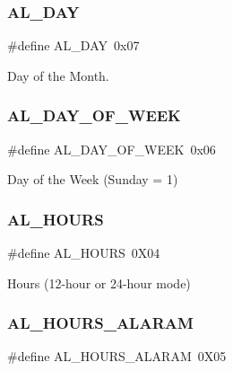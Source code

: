 \hypertarget{group___serial_gaa60f550f2d0cc5a3fe5177039150bc60}{}\label{group___serial_gaa60f550f2d0cc5a3fe5177039150bc60} 
\subsubsection{\texorpdfstring{A\+L\+\_\+\+D\+AY}{AL\_DAY}}
{\footnotesize\ttfamily \#define A\+L\+\_\+\+D\+AY~0x07}



Day of the Month. 

\hypertarget{group___serial_gaacd25fdddd522fbf292e61e26c3c442f}{}\label{group___serial_gaacd25fdddd522fbf292e61e26c3c442f} 
\subsubsection{\texorpdfstring{A\+L\+\_\+\+D\+A\+Y\+\_\+\+O\+F\+\_\+\+W\+E\+EK}{AL\_DAY\_OF\_WEEK}}
{\footnotesize\ttfamily \#define A\+L\+\_\+\+D\+A\+Y\+\_\+\+O\+F\+\_\+\+W\+E\+EK~0x06}



Day of the Week (Sunday = 1) 

\hypertarget{group___serial_ga3c46c3b006367d25664bae636198069c}{}\label{group___serial_ga3c46c3b006367d25664bae636198069c} 
\subsubsection{\texorpdfstring{A\+L\+\_\+\+H\+O\+U\+RS}{AL\_HOURS}}
{\footnotesize\ttfamily \#define A\+L\+\_\+\+H\+O\+U\+RS~0\+X04}



Hours (12-\/hour or 24-\/hour mode) 

\hypertarget{group___serial_gab46bf2cfed82e0746ac9a234744fbb10}{}\label{group___serial_gab46bf2cfed82e0746ac9a234744fbb10} 
\subsubsection{\texorpdfstring{A\+L\+\_\+\+H\+O\+U\+R\+S\+\_\+\+A\+L\+A\+R\+AM}{AL\_HOURS\_ALARAM}}
{\footnotesize\ttfamily \#define A\+L\+\_\+\+H\+O\+U\+R\+S\+\_\+\+A\+L\+A\+R\+AM~0\+X05}



